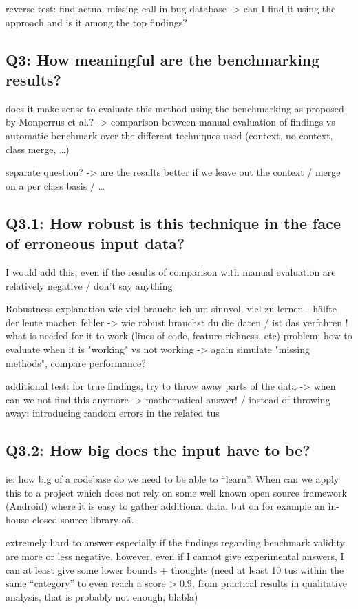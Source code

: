reverse test: find actual missing call in bug database -> can I find it using the approach and is it among the top findings?

\subsection{Q3: How meaningful are the benchmarking results?}
does it make sense to evaluate this method using the benchmarking as proposed by Monperrus et al.?
-> comparison between manual evaluation of findings vs automatic benchmark over the different techniques used (context, no context, class merge, \ldots)

separate question? -> are the results better if we leave out the context / merge on a per class basis / \ldots

\subsection{Q3.1: How robust is this technique in the face of erroneous input data?}
I would add this, even if the results of comparison with manual evaluation are relatively negative / don't say anything

Robustness explanation
    wie viel brauche ich um sinnvoll viel zu lernen - hälfte der leute machen fehler -> wie robust brauchst du die daten / ist das verfahren !
    what is needed for it to work (lines of code, feature richness, etc) 
    problem: how to evaluate when it is "working" vs not working -> again simulate "missing methods", compare performance?

additional test:
	for true findings, try to throw away parts of the data -> when can we not find this anymore -> mathematical answer!
    / instead of throwing away: introducing random errors in the related tus

\subsection{Q3.2: How big does the input have to be?}
ie: how big of a codebase do we need to be able to ``learn''. When can we apply this to a project which does not rely on some well known open source framework (Android) where it is easy to gather additional data, but on for example an in-house-closed-source library oä.

extremely hard to answer especially if the findings regarding benchmark validity are more or less negative.
however, even if I cannot give experimental answers, I can at least give some lower bounds + thoughts
(need at least 10 tus within the same ``category'' to even reach a score > 0.9, from practical results in qualitative analysis, that is probably not enough, blabla)

